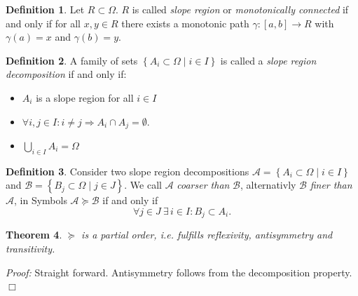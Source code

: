 \documentclass[a4paper,10pt,notitlepage,fullpage]{paper}
\theoremstyle{plain}
\newtheorem{thm}{Theorem}[section] %
\theoremstyle{definition}
\newtheorem{defn}[thm]{Definition} %
\begin{document}
\begin{defn}
Let $R \subset \Omega$. $R$ is called \emph{slope region} or \emph{monotonically connected} if and only if for all $x, y \in R$ there exists a monotonic path $\gamma: [a,b] \to R$ with $\gamma(a) = x$ and $\gamma(b) = y$.
\end{defn}

\begin{defn}
A family of sets $\left\{ A_i \subset \Omega \mid i \in I \right\}$ is called a \emph{slope region decomposition} if and only if:
\begin{itemize}
\item $A_i$ is a slope region for all $i \in I$
\item $\forall i,j \in I: i \neq j \Rightarrow A_i \cap A_j = \emptyset$.
\item $\bigcup_{i\in I} A_i = \Omega$
\end{itemize}
\end{defn}



\begin{defn}
Consider two slope region decompositions $\mathcal{A} = \left\{ A_i \subset \Omega \mid i \in I \right\}$ and $\mathcal{B} = \left\{ B_j \subset \Omega \mid j \in J \right\}$.
We call $\mathcal{A}$ \emph{coarser than} $\mathcal{B}$, alternativly $\mathcal{B}$ \emph{finer than} $\mathcal{A}$, in Symbols $\mathcal{A} \succeq \mathcal{B}$ if and only if
\begin{equation*}
\forall j \in J ~ \exists \, i \in I: B_j \subset A_i.
\end{equation*}
\end{defn}

\begin{thm}
$\succeq$ is a partial order, i.e. fulfills reflexivity, antisymmetry and transitivity.
\end{thm}
\emph{Proof:} Straight forward. Antisymmetry follows from the decomposition property. \hfill $\Box$
\end{document}
